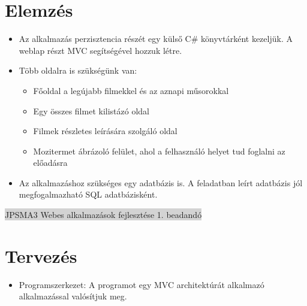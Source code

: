 \documentclass[11pt,a4paper]{article}
\begin{document}
\section{Elemzés}
\begin{itemize}
	\item Az alkalmazás perzisztencia részét egy külső C\# könyvtárként
	kezeljük. A weblap részt MVC segítségével hozzuk létre.
	\item Több oldalra is szükségünk van:
	\begin{itemize}
		\item Főoldal a legújabb filmekkel és az aznapi műsorokkal
		\item Egy összes filmet kilistázó oldal
		\item Filmek részletes leírására szolgáló oldal
		\item Mozitermet ábrázoló felület, ahol a felhasználó helyet tud
		foglalni az előadásra
	\end{itemize}
	\item Az alkalmazáshoz szükséges egy adatbázis is. A feladatban leírt
	adatbázis jól megfogalmazható SQL adatbázisként.
\end{itemize}
\newpage
\thispagestyle{empty}
\begin{center}
	\colorbox{lightgray}{{\large JPSMA3} \hspace{3cm} {\large Webes alkalmazások fejlesztése 1. beadandó} \hspace{5cm} \thepage}
\end{center}
\section{Tervezés}
\begin{itemize}
	\item Programszerkezet: A programot egy MVC architektúrát alkalmazó
	alkalmazással valósítjuk meg.
\end{itemize}
\end{document}
